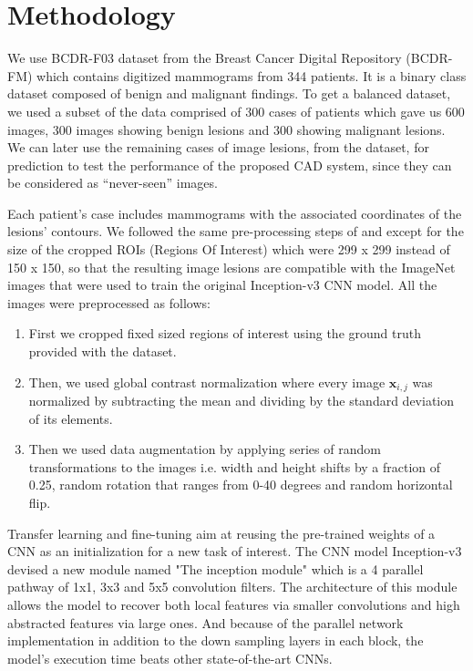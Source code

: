 \documentclass{article}
\begin{document}
\section{Methodology}

We use BCDR-F03 dataset \citep{lopez2012bcdr}from the Breast Cancer Digital Repository (BCDR-FM) which contains digitized mammograms from 344 patients. It is a binary class dataset composed of benign and malignant findings. To get a balanced dataset, we used a subset of the data comprised of 300 cases of patients which gave us 600 images, 300 images showing benign lesions and 300 showing malignant lesions. We can later use the remaining cases of image lesions, from the dataset, for prediction to test the performance of the proposed CAD system, since they can be considered as “never-seen” images.

Each patient’s case includes mammograms with the associated coordinates of the lesions’ contours.
We followed the same pre-processing steps of \citep{arevalo2016representation} and \citep{perre2017lesion} except for the size of the cropped ROIs (Regions Of  Interest) which were 299 x 299 instead of 150 x 150,  so that the resulting image lesions are compatible with the ImageNet images that were used to train the original Inception-v3 CNN model. 
All the images were preprocessed as follows: 
\begin{enumerate}
\item First we cropped fixed sized regions of interest using the ground truth provided with the dataset.\label{item:1}
\item Then, we used global contrast normalization where every image $\mathbf{x}_{i,j}$ was normalized by subtracting the mean and dividing by the standard deviation of its elements.\label{item:2}
\item Then we used data augmentation by applying series of random transformations to the images i.e. width and height shifts by a fraction of 0.25, random rotation that ranges from 0-40 degrees and random horizontal flip. \label{item:3} 
\end{enumerate}

Transfer learning and fine-tuning aim at reusing the pre-trained weights of a CNN as an initialization for a new task of interest. The CNN model Inception-v3 \citep{szegedy2016rethinking} devised a new module named "The inception module" which is a 4 parallel pathway of 1x1, 3x3 and 5x5 convolution filters. The architecture of this module allows the model to recover both local features via smaller convolutions and high abstracted features via large ones. And because of the parallel network implementation in addition to the down sampling layers in each block, the model's execution time beats other state-of-the-art CNNs.
\end{document}
